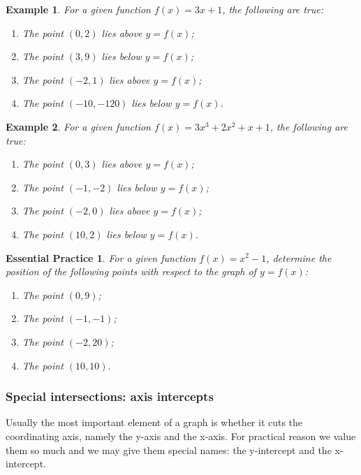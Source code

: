 \documentclass[12pt]{article}
\newtheorem*{example}{Example}
\newtheorem{exercise}{Essential Practice}[subsection]
\begin{document}
    \begin{example}
        For a given function $f(x)=3x+1$, the following are true:\begin{enumerate}
            \item The point $(0,2)$ lies above $y=f(x)$;
            \item The point $(3,9)$ lies below $y=f(x)$;
            \item The point $(-2,1)$ lies above $y=f(x)$;
            \item The point $(-10,-120)$ lies below $y=f(x)$.
        \end{enumerate} 
    \end{example}

    \begin{example}
        For a given function $f(x)=3x^3+2x^2+x+1$, the following are true:\begin{enumerate}
            \item The point $(0,3)$ lies above $y=f(x)$;
            \item The point $(-1,-2)$ lies below $y=f(x)$;
            \item The point $(-2,0)$ lies above $y=f(x)$;
            \item The point $(10,2)$ lies below $y=f(x)$.
        \end{enumerate} 
    \end{example}

    \begin{exercise}
        For a given function $f(x)=x^2-1$, determine the position of the following points with respect to the graph of $y=f(x)$:\begin{enumerate}
            \item The point $(0,9)$;
            \item The point $(-1,-1)$;
            \item The point $(-2,20)$;
            \item The point $(10,10)$.
        \end{enumerate} 
    \end{exercise}

    \subsubsection*{Special intersections: axis intercepts}

    Usually the most important element of a graph is whether it cuts the coordinating axis, namely the y-axis and the x-axis. For practical reason we value them so much and we may give them special names: the y-intercept and the x-intercept.
\end{document}
